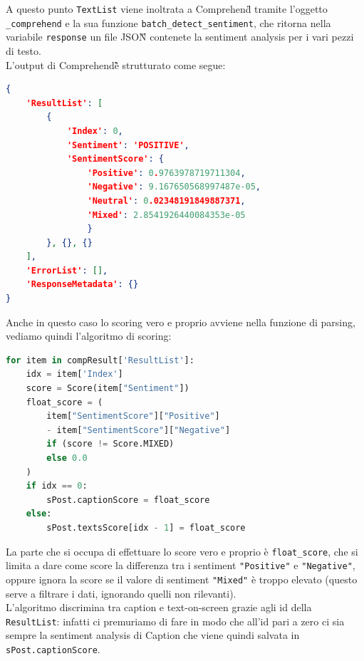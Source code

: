 A questo punto \verb+TextList+ viene inoltrata a Comprehend\G{} tramite l'oggetto \verb+_comprehend+ e la sua
funzione \verb+batch_detect_sentiment+, che ritorna nella variabile \verb+response+ un file JSON\G{}
contenete la sentiment analysis per i vari pezzi di testo. \\
L'output di Comprehend\G è strutturato come segue:
\begin{lstlisting}[language=JSON]
{
    'ResultList': [
        {
            'Index': 0, 
            'Sentiment': 'POSITIVE', 
            'SentimentScore': {
                'Positive': 0.9763978719711304, 
                'Negative': 9.167650568997487e-05, 
                'Neutral': 0.02348191849887371, 
                'Mixed': 2.8541926440084353e-05
                }
        }, {}, {}
    ], 
    'ErrorList': [], 
    'ResponseMetadata': {}
}
\end{lstlisting}
Anche in questo caso lo scoring vero e proprio avviene nella funzione di parsing, vediamo quindi
l'algoritmo di scoring:
\begin{lstlisting}[language=Python]
for item in compResult['ResultList']:
    idx = item['Index']
    score = Score(item["Sentiment"])
    float_score = (
        item["SentimentScore"]["Positive"] 
        - item["SentimentScore"]["Negative"]
        if (score != Score.MIXED)
        else 0.0
    )
    if idx == 0:
        sPost.captionScore = float_score
    else:
        sPost.textsScore[idx - 1] = float_score
\end{lstlisting}
La parte che si occupa di effettuare lo score vero e proprio è \verb+float_score+, che si limita
a dare come score la differenza tra i sentiment \verb+"Positive"+ e \verb+"Negative"+, oppure ignora la score se 
il valore di sentiment \verb+"Mixed"+ è troppo elevato (questo serve a filtrare i dati,
ignorando quelli non rilevanti).\\
L'algoritmo discrimina tra caption e text-on-screen grazie agli id
della \verb+ResultList+: infatti ci premuriamo di fare in modo che all'id pari a zero ci sia sempre la sentiment 
analysis di Caption che viene quindi salvata in \verb+sPost.captionScore+.

